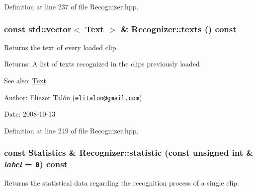 Definition at line 237 of file Recognizer.hpp.\hypertarget{class_recognizer_2a365c34f1447cdc3311d311e02bf2ed}{
\subsubsection[texts]{\setlength{\rightskip}{0pt plus 5cm}const std::vector$<$ {\bf Text} $>$ \& Recognizer::texts () const}}
\label{class_recognizer_2a365c34f1447cdc3311d311e02bf2ed}


Returns the text of every loaded clip. 

\begin{Desc}
\item[Returns:]A list of texts recognized in the clips previously loaded\end{Desc}
\begin{Desc}
\item[See also:]\hyperlink{class_text}{Text}\end{Desc}
\begin{Desc}
\item[Author:]Eliezer Talón (\href{mailto:elitalon@gmail.com}{\tt elitalon@gmail.com}) \end{Desc}
\begin{Desc}
\item[Date:]2008-10-13 \end{Desc}


Definition at line 249 of file Recognizer.hpp.\hypertarget{class_recognizer_b941b1ad42c3bacb3c829acf7fc689de}{
\subsubsection[statistic]{\setlength{\rightskip}{0pt plus 5cm}const {\bf Statistics} \& Recognizer::statistic (const unsigned int \& {\em label} = {\tt 0}) const}}
\label{class_recognizer_b941b1ad42c3bacb3c829acf7fc689de}


Returns the statistical data regarding the recognition process of a single clip. 

